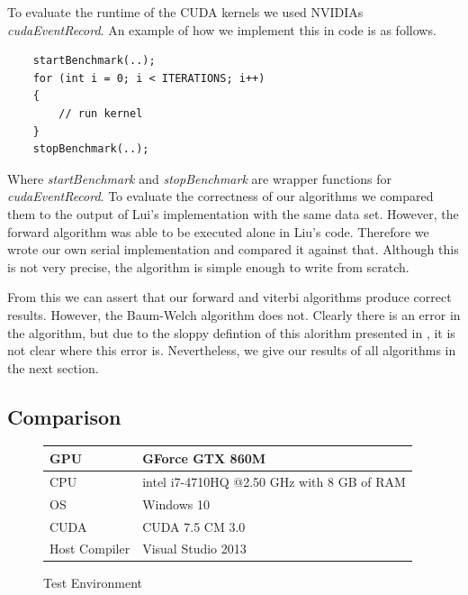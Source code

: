 \documentclass[english, paper=a4]{scrartcl}
\begin{document}
To evaluate the runtime of the CUDA kernels we used NVIDIAs \textit{cudaEventRecord}. An example of how we implement this in code is as follows.

\begin{verbatim}
	startBenchmark(..);
	for (int i = 0; i < ITERATIONS; i++)
	{
		// run kernel
	}
	stopBenchmark(..);
\end{verbatim}

Where \textit{startBenchmark} and \textit{stopBenchmark} are wrapper functions for \textit{cudaEventRecord}.
To evaluate the correctness of our algorithms we compared them to the output of Lui's implementation with the same data set. However, the forward algorithm was able to be executed alone in Liu's code. Therefore we wrote our own serial implementation and compared it against that. Although this is not very precise, the algorithm is simple enough to write from scratch.

From this we can assert that our forward and viterbi algorithms produce correct results. However, the Baum-Welch algorithm does not. Clearly there is an error in the algorithm, but due to the sloppy defintion of this alorithm presented in \cite{cuhmm}, it is not clear where this error is. Nevertheless, we give our results of all algorithms in the next section.

\subsection{Comparison}

\begin{figure}[H]
\centering
\begin{tabular}{|l|l|}
\hline
GPU &GForce GTX 860M \\ \hline
CPU & intel i7-4710HQ @2.50 GHz with 8 GB of RAM  \\ \hline
OS & Windows 10 \\ \hline
CUDA & CUDA 7.5 CM 3.0 \\ \hline
Host Compiler & Visual Studio 2013 \\ \hline

\end{tabular}

\caption{Test Environment}
\end{figure}
\end{document}

